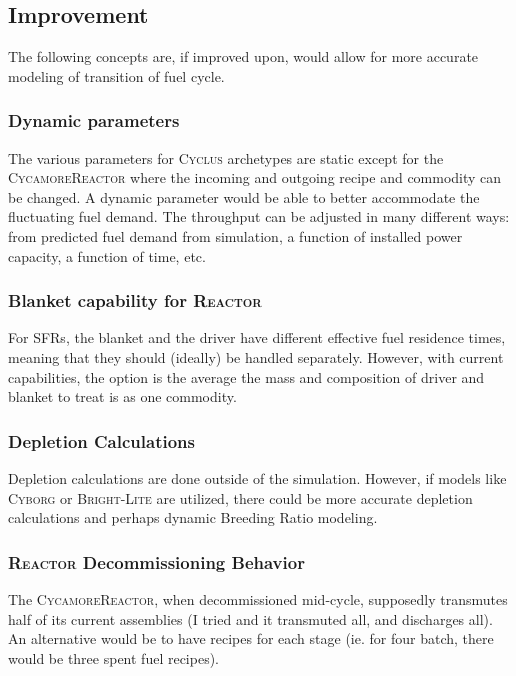 \documentclass{article}
\newcommand{\Cyclus}{\textsc{Cyclus}\xspace}%
\newcommand{\Cycamore}{\textsc{Cycamore}\xspace}%
\begin{document}
\subsection{Improvement}
The following concepts are, if improved upon, would allow for more accurate modeling of
transition of fuel cycle.

\subsubsection{Dynamic parameters}
The various parameters for \Cyclus archetypes are static except for the \Cycamore \textsc{Reactor}\xspace
where the incoming and outgoing recipe and commodity can be changed. A dynamic parameter would be able
to better accommodate the fluctuating fuel demand. The throughput can be adjusted in many different ways:
from predicted fuel demand from simulation, a function of installed power capacity, a function of time, etc.

\subsubsection{Blanket capability for \textsc{Reactor}\xspace}
For \glspl{SFR}, the blanket and the driver have different effective fuel residence times, meaning that
they should (ideally) be handled separately. However, with current capabilities, the option is the average
the mass and composition of driver and blanket to treat is as one commodity.

\subsubsection{Depletion Calculations}
Depletion calculations are done outside of the simulation. However, if models like \textsc{Cyborg}\xspace
or \textsc{Bright-Lite}\xspace are utilized, there could be more accurate depletion calculations and 
perhaps dynamic Breeding Ratio modeling.

\subsubsection{\textsc{Reactor}\xspace Decommissioning Behavior}
The \Cycamore \textsc{Reactor}\xspace, when decommissioned mid-cycle, supposedly transmutes half of
its current assemblies (I tried and it transmuted all, and discharges all). An alternative would
be to have recipes for each stage (ie. for four batch, there would be three spent fuel recipes).




\end{document}
